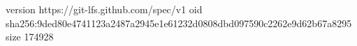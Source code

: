 version https://git-lfs.github.com/spec/v1
oid sha256:9ded80e4741123a2487a2945e1e61232d0808dbd097590c2262e9d62b67a8295
size 174928
